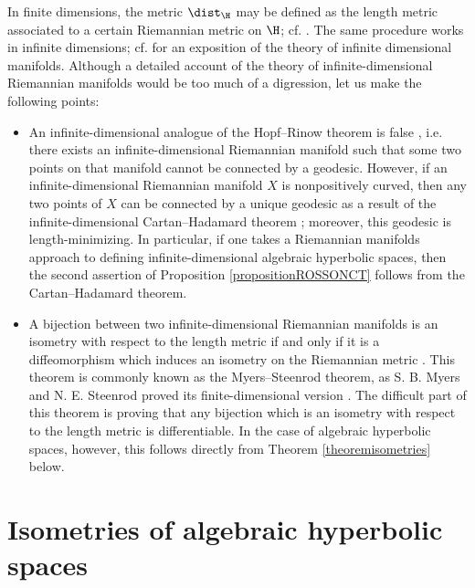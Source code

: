 \begin{remark}
\label{remarkriemannian}
In finite dimensions, the metric $\dist_\H$ may be defined as the length metric associated to a certain Riemannian metric on $\H$; cf. \cite[]{Quint}. The same procedure works in infinite dimensions; cf. \cite{Lang_differential_geometry} for an exposition of the theory of infinite dimensional manifolds. Although a detailed account of the theory of infinite-dimensional Riemannian manifolds would be too much of a digression, let us make the following points:
\begin{itemize}
\item An infinite-dimensional analogue of the Hopf--Rinow theorem is false \cite{Atkin}, i.e. there exists an infinite-dimensional Riemannian manifold such that some two points on that manifold cannot be connected by a geodesic. However, if an infinite-dimensional Riemannian manifold $X$ is nonpositively curved, then any two points of $X$ can be connected by a unique geodesic as a result of the infinite-dimensional Cartan--Hadamard theorem \cite[IX, Theorem 3.8]{Lang_differential_geometry}; moreover, this geodesic is length-minimizing. In particular, if one takes a Riemannian manifolds approach to defining infinite-dimensional algebraic hyperbolic spaces, then the second assertion of Proposition \ref{propositionROSSONCT} follows from the Cartan--Hadamard theorem.
\item A bijection between two infinite-dimensional Riemannian manifolds is an isometry with respect to the length metric if and only if it is a diffeomorphism which induces an isometry on the Riemannian metric \cite[Theorem 7]{GJR}. This theorem is commonly known as the Myers--Steenrod theorem, as S. B. Myers and N. E. Steenrod proved its finite-dimensional version \cite{MyersSteenrod}. The difficult part of this theorem is proving that any bijection which is an isometry with respect to the length metric is differentiable. In the case of algebraic hyperbolic spaces, however, this follows directly from Theorem \ref{theoremisometries} below.
\end{itemize}
\end{remark}


\bigskip
\section{Isometries of algebraic hyperbolic spaces}
\label{subsectionisometries}

